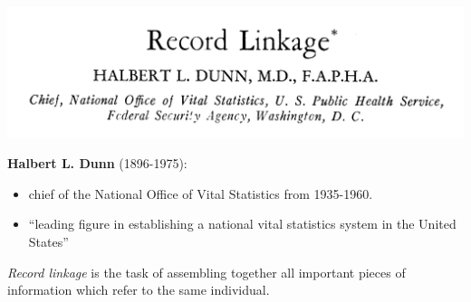 \documentclass[compress]{beamer}
\newcommand{\1}[1]{\mathbb{I}\!\left[#1\right]} %
\theoremstyle{plain}
\begin{document}
\begin{frame}
    
\begin{center}
    \includegraphics[width=0.8\linewidth]{Dunn-0}
\end{center}

\textbf{Halbert L. Dunn} (1896-1975):

\begin{itemize}
    \item chief of the National Office of Vital Statistics from 1935-1960.
    \item ``leading figure in establishing a national vital statistics system in the United States''
\end{itemize}

    
\end{frame}

\begin{frame}


\emph{Record linkage} is the task of assembling together all important pieces of information which refer to the same individual.

\end{frame}
\end{document}
